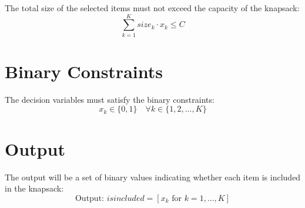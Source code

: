 \documentclass{article}
\begin{document}
The total size of the selected items must not exceed the capacity of the knapsack:
\[
\sum_{k=1}^{K} size_k \cdot x_k \leq C
\]

\section*{Binary Constraints}

The decision variables must satisfy the binary constraints:
\[
x_k \in \{0, 1\} \quad \forall k \in \{1, 2, \ldots, K\}
\]

\section*{Output}

The output will be a set of binary values indicating whether each item is included in the knapsack:
\[
\text{Output: } isincluded = [x_k \text{ for } k = 1, \ldots, K]
\]
\end{document}
